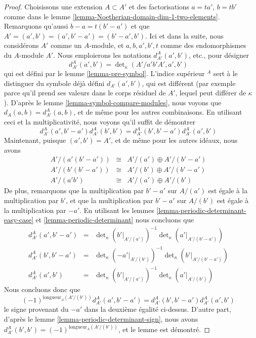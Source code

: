 \begin{proof}
\medskip\noindent
Choisissons une extension $A \subset A'$ et des factorisations
$a = ta'$, $b = tb'$ comme dans le
lemme \ref{lemma-Noetherian-domain-dim-1-two-elements}.
Remarquons qu'aussi $b - a = t(b' - a')$ et que
$A' = (a', b') = (a', b' - a') = (b' - a', b')$.
Ici et dans la suite, nous considérons $A'$ comme un $A$-module, et
$a, b, a', b', t$ comme des endomorphismes du $A$-module $A'$.
Nous emploierons les notations $d^A_{A'}(a', b')$, etc., pour désigner
$$
d^A_{A'}(a', b')
=
\det\nolimits_\kappa(A'/a'b'A', a', b')
$$
qui est défini par le lemme \ref{lemma-pre-symbol}. L'indice supérieur ${}^A$
sert à le distinguer du symbole déjà défini
$d_{A'}(a', b')$, qui est différent (par exemple parce qu'il prend ses valeurs
dans le corps résiduel de $A'$, lequel peut différer de $\kappa$).
D'après le lemme \ref{lemma-symbol-compare-modules}, nous voyons que
$d_A(a, b) = d^A_{A'}(a, b)$,
et de même pour les autres combinaisons.
En utilisant ceci et la multiplicativité, nous voyons qu'il suffit de démontrer
$$
d^A_{A'}(a', b' - a') d^A_{A'}(b', b')
=
d^A_{A'}(b', b' - a') d^A_{A'}(a', b')
$$
Maintenant, puisque $(a', b') = A'$, et de même pour les autres idéaux, nous avons
$$
\begin{matrix}
A'/(a'(b' - a')) & \cong & A'/(a') \oplus A'/(b' - a') \\
A'/(b'(b' - a')) & \cong & A'/(b') \oplus A'/(b' - a') \\
A'/(a'b') & \cong & A'/(a') \oplus A'/(b')
\end{matrix}
$$
De plus, remarquons que la multiplication par $b' - a'$ sur
$A/(a')$ est égale à la multiplication par $b'$, et que
la multiplication par $b' - a'$ sur $A/(b')$ est égale à la multiplication par $-a'$.
En utilisant les lemmes
\ref{lemma-periodic-determinant-easy-case} et
\ref{lemma-periodic-determinant}
nous concluons que
$$
\begin{matrix}
d^A_{A'}(a', b' - a') & = &
\det\nolimits_\kappa(b'|_{A'/(a')})^{-1}
\det\nolimits_\kappa(a'|_{A'/(b' - a')}) \\
d^A_{A'}(b', b' - a') & = &
\det\nolimits_\kappa(-a'|_{A'/(b')})^{-1}
\det\nolimits_\kappa(b'|_{A'/(b' - a')}) \\
d^A_{A'}(a', b') & = &
\det\nolimits_\kappa(b'|_{A'/(a')})^{-1}
\det\nolimits_\kappa(a'|_{A'/(b')})
\end{matrix}
$$
Nous concluons donc que
$$
(-1)^{\text{longueur}_A(A'/(b'))}
d^A_{A'}(a', b' - a')
=
d^A_{A'}(b', b' - a') d^A_{A'}(a', b')
$$
le signe provenant du $-a'$ dans la deuxième égalité ci-dessus.
D'autre part, d'après le lemme \ref{lemma-periodic-determinant-sign}, nous avons
$d^A_{A'}(b', b') = (-1)^{\text{longueur}_A(A'/(b'))}$, et le lemme
est démontré.
\end{proof}

